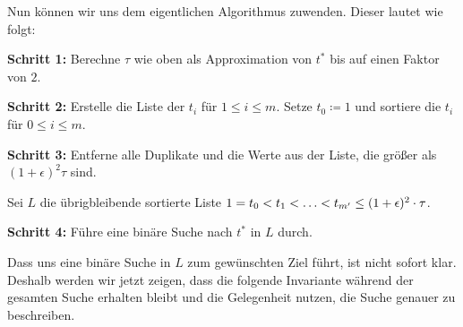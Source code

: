 Nun können wir uns dem eigentlichen Algorithmus zuwenden. Dieser lautet wie folgt:

\begin{description}
	\item{\textbf{Schritt 1:}} Berechne $\tau$ wie oben als Approximation von $t^*$ bis auf einen Faktor von $2$.
	\item{\textbf{Schritt 2:}} Erstelle die Liste der $t_i$ für $1 \leq i \leq m$. Setze $t_0 \coloneqq 1$ und sortiere die $t_i$ für $0 \leq i \leq m$.
	\item{\textbf{Schritt 3:}} Entferne alle Duplikate und die Werte aus der Liste, die größer als $(1 + \epsilon)^2 \tau$ sind.
	
	Sei $L$ die übrigbleibende sortierte Liste $1 = t_0 < t_1 < \mathellipsis < t_{m'} \leq (1 + \epsilon)^2\cdot \tau$.
	\item{\textbf{Schritt 4:}} Führe eine binäre Suche nach $t^*$ in $L$ durch.
\end{description}

Dass uns eine binäre Suche in $L$ zum gewünschten Ziel führt, ist nicht sofort klar. Deshalb werden wir jetzt zeigen, dass die folgende Invariante während der gesamten Suche erhalten bleibt und die Gelegenheit nutzen, die Suche genauer zu beschreiben.

